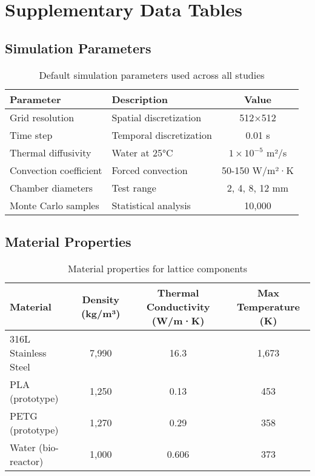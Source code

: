 \section{Supplementary Data Tables}
\label{app:data}

\subsection{Simulation Parameters}

\begin{table}[H]
\centering
\caption{Default simulation parameters used across all studies}
\begin{tabular}{@{}llc@{}}
\toprule
Parameter & Description & Value \\
\midrule
Grid resolution & Spatial discretization & 512×512 \\
Time step & Temporal discretization & 0.01 s \\
Thermal diffusivity & Water at 25°C & $1 \times 10^{-5}$ m²/s \\
Convection coefficient & Forced convection & 50-150 W/m²·K \\
Chamber diameters & Test range & 2, 4, 8, 12 mm \\
Monte Carlo samples & Statistical analysis & 10,000 \\
\bottomrule
\end{tabular}
\end{table}

\subsection{Material Properties}

\begin{table}[H]
\centering
\caption{Material properties for lattice components}
\begin{tabular}{@{}lccc@{}}
\toprule
Material & Density (kg/m³) & Thermal Conductivity (W/m·K) & Max Temperature (K) \\
\midrule
316L Stainless Steel & 7,990 & 16.3 & 1,673 \\
PLA (prototype) & 1,250 & 0.13 & 453 \\
PETG (prototype) & 1,270 & 0.29 & 358 \\
Water (bio-reactor) & 1,000 & 0.606 & 373 \\
\bottomrule
\end{tabular}
\end{table}